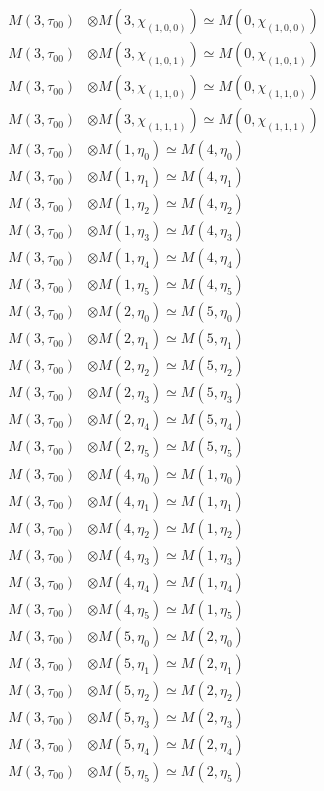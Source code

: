 \begin{align*}
M(3,\tau_{00}) &\otimes M(3,\chi_{(1,0,0)}) \simeq M(0,\chi_{(1,0,0)}) \\
M(3,\tau_{00}) &\otimes M(3,\chi_{(1,0,1)}) \simeq M(0,\chi_{(1,0,1)}) \\
M(3,\tau_{00}) &\otimes M(3,\chi_{(1,1,0)}) \simeq M(0,\chi_{(1,1,0)}) \\
M(3,\tau_{00}) &\otimes M(3,\chi_{(1,1,1)}) \simeq M(0,\chi_{(1,1,1)}) \\
M(3,\tau_{00}) &\otimes M(1,\eta_{0}) \simeq M(4,\eta_{0}) \\
M(3,\tau_{00}) &\otimes M(1,\eta_{1}) \simeq M(4,\eta_{1}) \\
M(3,\tau_{00}) &\otimes M(1,\eta_{2}) \simeq M(4,\eta_{2}) \\
M(3,\tau_{00}) &\otimes M(1,\eta_{3}) \simeq M(4,\eta_{3}) \\
M(3,\tau_{00}) &\otimes M(1,\eta_{4}) \simeq M(4,\eta_{4}) \\
M(3,\tau_{00}) &\otimes M(1,\eta_{5}) \simeq M(4,\eta_{5}) \\
M(3,\tau_{00}) &\otimes M(2,\eta_{0}) \simeq M(5,\eta_{0}) \\
M(3,\tau_{00}) &\otimes M(2,\eta_{1}) \simeq M(5,\eta_{1}) \\
M(3,\tau_{00}) &\otimes M(2,\eta_{2}) \simeq M(5,\eta_{2}) \\
M(3,\tau_{00}) &\otimes M(2,\eta_{3}) \simeq M(5,\eta_{3}) \\
M(3,\tau_{00}) &\otimes M(2,\eta_{4}) \simeq M(5,\eta_{4}) \\
M(3,\tau_{00}) &\otimes M(2,\eta_{5}) \simeq M(5,\eta_{5}) \\
M(3,\tau_{00}) &\otimes M(4,\eta_{0}) \simeq M(1,\eta_{0}) \\
M(3,\tau_{00}) &\otimes M(4,\eta_{1}) \simeq M(1,\eta_{1}) \\
M(3,\tau_{00}) &\otimes M(4,\eta_{2}) \simeq M(1,\eta_{2}) \\
M(3,\tau_{00}) &\otimes M(4,\eta_{3}) \simeq M(1,\eta_{3}) \\
M(3,\tau_{00}) &\otimes M(4,\eta_{4}) \simeq M(1,\eta_{4}) \\
M(3,\tau_{00}) &\otimes M(4,\eta_{5}) \simeq M(1,\eta_{5}) \\
M(3,\tau_{00}) &\otimes M(5,\eta_{0}) \simeq M(2,\eta_{0}) \\
M(3,\tau_{00}) &\otimes M(5,\eta_{1}) \simeq M(2,\eta_{1}) \\
M(3,\tau_{00}) &\otimes M(5,\eta_{2}) \simeq M(2,\eta_{2}) \\
M(3,\tau_{00}) &\otimes M(5,\eta_{3}) \simeq M(2,\eta_{3}) \\
M(3,\tau_{00}) &\otimes M(5,\eta_{4}) \simeq M(2,\eta_{4}) \\
M(3,\tau_{00}) &\otimes M(5,\eta_{5}) \simeq M(2,\eta_{5}) \\
\end{align*}

